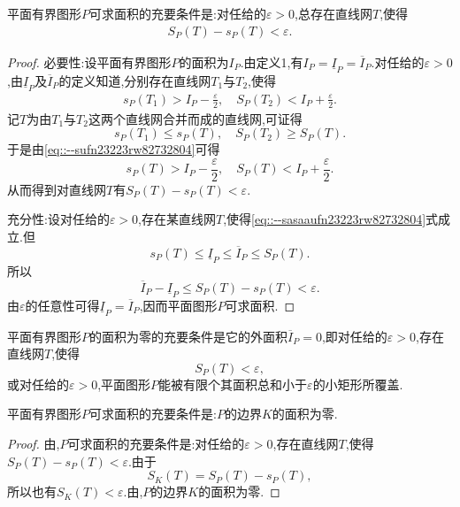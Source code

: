 \documentclass[../../main.tex]{subfiles}%
\begin{document}
\begin{theorem}\label{theorem:平面有界图形可求面积的充要条件1}
平面有界图形$P$可求面积的充要条件是:对任给的$\varepsilon > 0$,总存在直线网$T$,使得
\begin{align}
S_P(T) - s_P(T) < \varepsilon. \label{eq::--sasaaufn23223rw82732804}
\end{align}
\end{theorem}
\begin{proof}

{\heiti 必要性:}设平面有界图形$P$的面积为$I_P$.由定义1,有$I_P = \underline{I}_P = \overline{I}_P$.对任给的$\varepsilon > 0$,由$\underline{I}_P$及$\overline{I}_P$的定义知道,分别存在直线网$T_1$与$T_2$,使得
\begin{align}
s_P(T_1) > I_P - \frac{\varepsilon}{2}, \quad S_P(T_2) < I_P + \frac{\varepsilon}{2}. \label{eq::--sufn23223rw82732804}
\end{align}
记$T$为由$T_1$与$T_2$这两个直线网合并而成的直线网,可证得
\[
s_P(T_1) \leqslant s_P(T), \quad S_P(T_2) \geqslant S_P(T).
\]
于是由\eqref{eq::--sufn23223rw82732804}可得
\[
s_P(T) > I_P - \frac{\varepsilon}{2}, \quad S_P(T) < I_P + \frac{\varepsilon}{2}.
\]
从而得到对直线网$T$有$S_P(T) - s_P(T) < \varepsilon$.

{\heiti 充分性:}设对任给的$\varepsilon > 0$,存在某直线网$T$,使得\eqref{eq::--sasaaufn23223rw82732804}式成立.但
\[
s_P(T) \leqslant \underline{I}_P \leqslant \overline{I}_P \leqslant S_P(T).
\]
所以
\[
\overline{I}_P - \underline{I}_P \leqslant S_P(T) - s_P(T) < \varepsilon.
\]
由$\varepsilon$的任意性可得$\underline{I}_P = \overline{I}_P$,因而平面图形$P$可求面积.

\end{proof}

\begin{corollary}\label{corollary:平面有界图形可求面积的充要条件2}
平面有界图形$P$的面积为零的充要条件是它的外面积$\overline{I}_P = 0$,即对任给的$\varepsilon > 0$,存在直线网$T$,使得
\[
S_P(T) < \varepsilon,
\]
或对任给的$\varepsilon > 0$,平面图形$P$能被有限个其面积总和小于$\varepsilon$的小矩形所覆盖.
\end{corollary}

\begin{theorem}
平面有界图形$P$可求面积的充要条件是:$P$的边界$K$的面积为零.
\end{theorem}
\begin{proof}

由,$P$可求面积的充要条件是:对任给的$\varepsilon > 0$,存在直线网$T$,使得$S_P(T) - s_P(T) < \varepsilon$.由于
\[
S_K(T) = S_P(T) - s_P(T),
\]
所以也有$S_K(T) < \varepsilon$.由,$P$的边界$K$的面积为零.

\end{proof}
\end{document}
